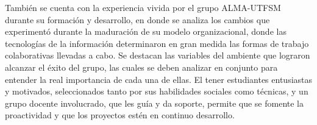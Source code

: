 También se cuenta con la experiencia vivida por el grupo ALMA-UTFSM durante
su formación y desarrollo\cite{utfsm_alma}, en donde se analiza los cambios
que experimentó durante la maduración de su modelo organizacional, donde las
tecnologías de la información determinaron en gran medida las formas de
trabajo colaborativas llevadas a cabo. Se destacan las variables del ambiente
que lograron alcanzar el éxito del grupo, las cuales se deben analizar en
conjunto para entender la real importancia de cada una de ellas. El tener estudiantes
entusiastas y motivados, seleccionados tanto por sus habilidades sociales como
técnicas, y un grupo docente involucrado, que les guía y da soporte, permite
que se fomente la proactividad y que los proyectos estén en
continuo desarrollo.


